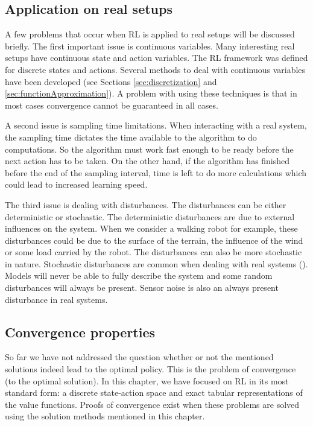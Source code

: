 \documentclass[a4paper,11pt]{mscLiterature}
\begin{document}
	\subsection{Application on real setups} \label{sec:applicationOnRealSetups}
	A few problems that occur when RL is applied to real setups will be discussed briefly. The first important issue is continuous variables. Many interesting real setups have continuous state and action variables. The RL framework was defined for discrete states and actions. Several methods to deal with continuous variables have been developed (see Sections \ref{sec:discretization} and \ref{sec:functionApproximation}). A problem with using these techniques is that in most cases convergence cannot be guaranteed in all cases. 
	
	A second issue is sampling time limitations. When interacting with a real system, the sampling time dictates the time available to the algorithm to do computations. So the algorithm must work fast enough to be ready before the next action has to be taken. On the other hand, if the algorithm has finished before the end of the sampling interval, time is left to do more calculations which could lead to increased learning speed. 	
	
	The third issue is dealing with disturbances. The disturbances can be either deterministic or stochastic. The deterministic disturbances are due to external influences on the system. When we consider a walking robot for example, these disturbances could be due to the surface of the terrain, the influence of the wind or some load carried by the robot. The disturbances can also be more stochastic in nature. Stochastic disturbances are common when dealing with real systems (\cite{Mahadevan:96}). Models will never be able to fully describe the system and some random disturbances will always be present. Sensor noise is also an always present disturbance in real systems.
	
	\subsection{Convergence properties}
	So far we have not addressed the question whether or not the mentioned solutions indeed lead to the optimal policy. This is the problem of convergence (to the optimal solution). In this chapter, we have focused on RL in its most standard form: a discrete state-action space and exact tabular representations of the value functions. Proofs of convergence exist when these problems are solved using the solution methods mentioned in this chapter. 
	
\end{document}
